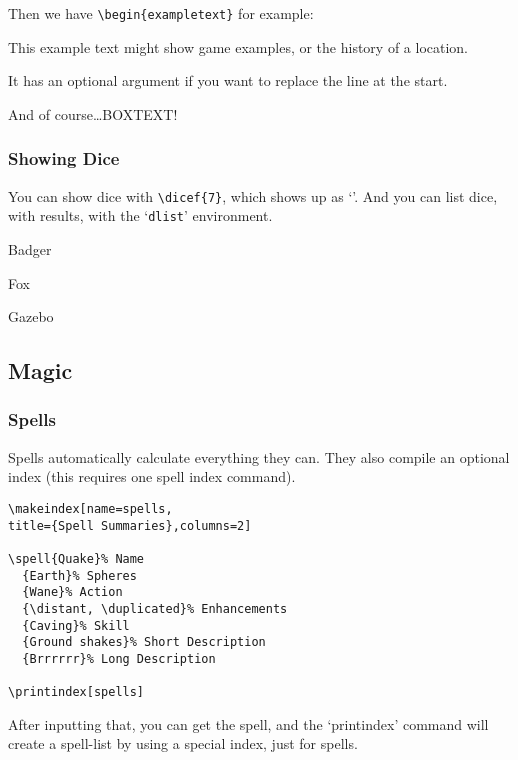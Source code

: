 \documentclass[a4paper,openany]{book}
\begin{document}
\begin{multicols}{2}
Then we have \verb"\begin{exampletext}" for example:

\begin{exampletext}
  This example text might show game examples, or the history of a location.

  It has an optional argument if you want to replace the line at the start.

\end{exampletext}

\begin{boxtext}
  And of course\ldots BOXTEXT!

\end{boxtext}

\subsubsection{Showing Dice}

You can show dice with \verb"\dicef{7}", which shows up as `'.
And you can list dice, with results, with the `\texttt{dlist}' environment.

\begin{dlist}
  \item Badger
  \item Fox
  \item Gazebo
\end{dlist}

\subsection{Magic}

\subsubsection{Spells}

Spells automatically calculate everything they can.
They also compile an optional index (this requires one spell index command).

\begin{verbatim}
\makeindex[name=spells,
title={Spell Summaries},columns=2]

\spell{Quake}% Name
  {Earth}% Spheres
  {Wane}% Action
  {\distant, \duplicated}% Enhancements
  {Caving}% Skill
  {Ground shakes}% Short Description
  {Brrrrrr}% Long Description

\printindex[spells]
\end{verbatim}

After inputting that, you can get the spell, and the `printindex' command will create a spell-list by using a special index, just for spells.


\end{multicols}
\end{document}
